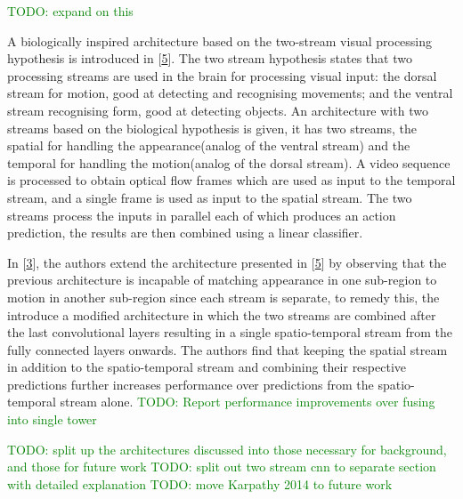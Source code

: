 \documentclass[A4paper,draft]{scrreprt}
\begin{document}
\textcolor{green}{TODO: expand on this}\newline

A biologically inspired architecture based on the two-stream visual
processing hypothesis is introduced in
{[}\protect\hyperlink{ref-simonyan2014_TwoStreamConvolutionalNetworks}{5}{]}.
The two stream hypothesis states that two processing streams are used in
the brain for processing visual input: the dorsal stream for motion,
good at detecting and recognising movements; and the ventral stream
recognising form, good at detecting objects. An architecture with two
streams based on the biological hypothesis is given, it has two streams,
the spatial for handling the appearance(analog of the ventral stream)
and the temporal for handling the motion(analog of the dorsal stream). A
video sequence is processed to obtain optical flow frames which are used
as input to the temporal stream, and a single frame is used as input to
the spatial stream. The two streams process the inputs in parallel each
of which produces an action prediction, the results are then combined
using a linear classifier.

In
{[}\protect\hyperlink{ref-feichtenhofer2016_ConvolutionalTwoStreamNetwork}{3}{]},
the authors extend the architecture presented in
{[}\protect\hyperlink{ref-simonyan2014_TwoStreamConvolutionalNetworks}{5}{]}
by observing that the previous architecture is incapable of matching
appearance in one sub-region to motion in another sub-region since each
stream is separate, to remedy this, the introduce a modified
architecture in which the two streams are combined after the last
convolutional layers resulting in a single spatio-temporal stream from
the fully connected layers onwards. The authors find that keeping the
spatial stream in addition to the spatio-temporal stream and combining
their respective predictions further increases performance over
predictions from the spatio-temporal stream alone.
\textcolor{green}{TODO: Report performance improvements over fusing into single tower}\newline

\textcolor{green}{TODO: split up the architectures discussed into those necessary for
background, and those for future work}\newline
\textcolor{green}{TODO: split out two stream cnn to separate section with detailed explanation}\newline
\textcolor{green}{TODO: move Karpathy 2014 to future work}\newline
\end{document}
